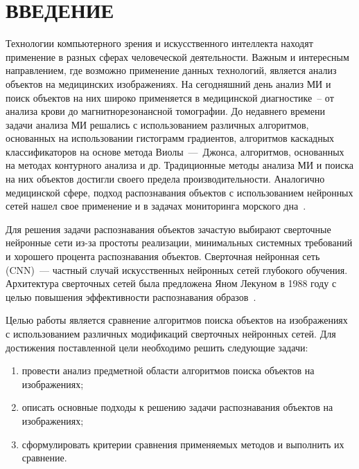 \chapter*{ВВЕДЕНИЕ}

Технологии компьютерного зрения и искусственного интеллекта находят применение в разных сферах человеческой деятельности.
Важным и интересным направлением, где возможно применение данных технологий, является анализ объектов на медицинских изображениях.
На сегодняшний день анализ МИ и поиск объектов на них широко применяется в медицинской диагностике~-- от анализа крови до магнитнорезонансной томографии.
До недавнего времени задачи анализа МИ решались с использованием различных алгоритмов, основанных на использовании гистограмм градиентов, алгоритмов каскадных классификаторов на основе метода Виолы~---~Джонса, алгоритмов, основанных на методах контурного анализа и др.
Традиционные методы анализа МИ и поиска на них объектов достигли своего предела производительности.
Аналогично медицинской сфере, подход распознавания объектов с использованием нейронных сетей нашел свое применение и в задачах мониторинга морского дна~\cite{intro1, intro2}.

Для решения задачи распознавания объектов зачастую выбирают сверточные нейронные сети из-за простоты реализации, минимальных системных требований и хорошего процента распознавания объектов. 
Сверточная нейронная сеть (CNN)~--- частный случай искусственных нейронных сетей глубокого обучения.
Архитектура сверточных сетей была предложена Яном Лекуном в 1988 году с целью повышения эффективности распознавания образов~\cite{cnn, cnndef}.

Целью работы является сравнение алгоритмов поиска объектов на изображениях с использованием различных модификаций сверточных нейронных сетей.
Для достижения поставленной цели необходимо решить следующие задачи:
\begin{enumerate}[leftmargin=1.6\parindent]
    \item провести анализ предметной области алгоритмов поиска объектов на изображениях;
    \item описать основные подходы к решению задачи распознавания объектов на изображениях;
    \item сформулировать критерии сравнения применяемых методов и выполнить их сравнение.
\end{enumerate}